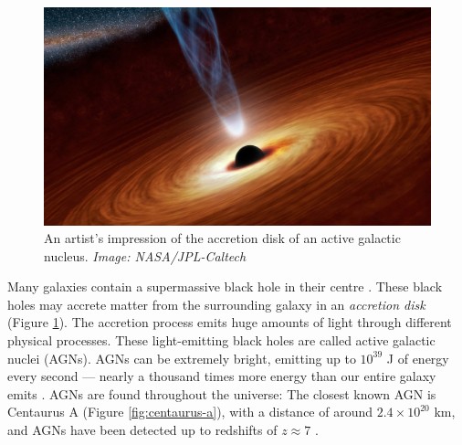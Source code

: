         \begin{figure}[!ht]
            \centering
            \includegraphics[height=0.2\textheight]
                {images/accretion_disk_artist_impression.jpg}
            \caption{An artist's impression of the accretion disk of an active
                galactic nucleus. \emph{Image: NASA/JPL-Caltech}}
            \label{fig:accretion-disk}
        \end{figure}

        Many galaxies contain a supermassive black hole in their centre
        \citep{richstone98}. These black holes may accrete matter from the
        surrounding galaxy in an \emph{accretion disk} (Figure
        \ref{fig:accretion-disk}). The accretion process emits huge amounts of
        light through different physical processes. These light-emitting black
        holes are called active galactic nuclei (AGNs). AGNs can be extremely
        bright, emitting up to $10^{39}$ J of energy every second --- nearly a
        thousand times more energy than our entire galaxy emits
        \citep{begelman84}. AGNs are found throughout the universe: The closest
        known AGN is Centaurus A (Figure \ref{fig:centaurus-a}), with a distance
        of around $2.4 \times 10^{20}$ km, and AGNs have been detected up to
        redshifts of $z \approx 7$ \citeme {}.

